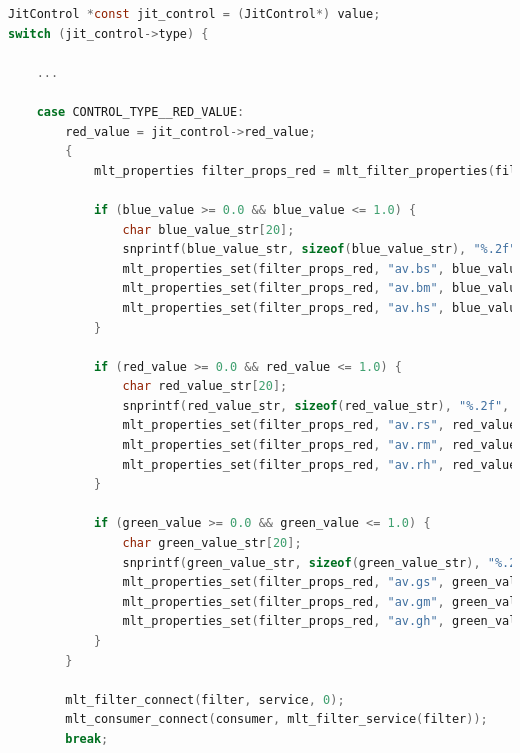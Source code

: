 \documentclass[../MasterThesis.tex]{subfiles}
\begin{document}
\begin{lstlisting}[language=c, numbers=none, columns=fullflexible]		
JitControl *const jit_control = (JitControl*) value;
switch (jit_control->type) {
		
	...
			
	case CONTROL_TYPE__RED_VALUE:
		red_value = jit_control->red_value;
		{
			mlt_properties filter_props_red = mlt_filter_properties(filter);
					
			if (blue_value >= 0.0 && blue_value <= 1.0) {
				char blue_value_str[20]; 
				snprintf(blue_value_str, sizeof(blue_value_str), "%.2f", blue_value);
				mlt_properties_set(filter_props_red, "av.bs", blue_value_str);
				mlt_properties_set(filter_props_red, "av.bm", blue_value_str);
				mlt_properties_set(filter_props_red, "av.hs", blue_value_str);
			}
					
			if (red_value >= 0.0 && red_value <= 1.0) {
				char red_value_str[20]; 
				snprintf(red_value_str, sizeof(red_value_str), "%.2f", red_value);
				mlt_properties_set(filter_props_red, "av.rs", red_value_str);
				mlt_properties_set(filter_props_red, "av.rm", red_value_str);
				mlt_properties_set(filter_props_red, "av.rh", red_value_str);
			}
	
			if (green_value >= 0.0 && green_value <= 1.0) {
				char green_value_str[20]; 
				snprintf(green_value_str, sizeof(green_value_str), "%.2f", green_value);
				mlt_properties_set(filter_props_red, "av.gs", green_value_str);
				mlt_properties_set(filter_props_red, "av.gm", green_value_str);
				mlt_properties_set(filter_props_red, "av.gh", green_value_str);
			} 
		}

		mlt_filter_connect(filter, service, 0);
		mlt_consumer_connect(consumer, mlt_filter_service(filter));
		break;
			
\end{lstlisting}
\end{document}
